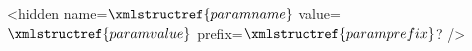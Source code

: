 <hidden name=$\xmlstructref{paramname}$ value=$\xmlstructref{paramvalue}$ prefix=$\xmlstructref{paramprefix}$? />
